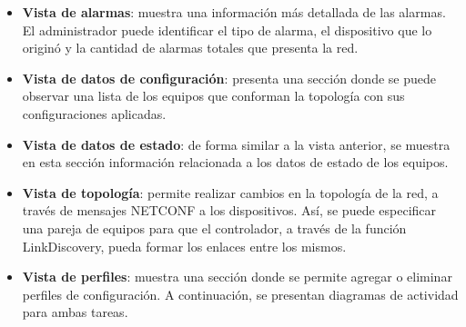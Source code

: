 \begin{itemize}
    \item \textbf{Vista de alarmas}: muestra una información más detallada de las alarmas. El administrador puede identificar el tipo de alarma, el dispositivo que lo originó y la cantidad de alarmas totales que presenta la red.
    
    \item \textbf{Vista de datos de configuración}: presenta una sección donde se puede observar una lista de los equipos que conforman la topología con sus configuraciones aplicadas.

    \item \textbf{Vista de datos de estado}: de forma similar a la vista anterior, se muestra en esta sección información relacionada a los datos de estado de los equipos. 

    \item \textbf{Vista de topología}: permite realizar cambios en la topología de la red, a través de mensajes NETCONF a los dispositivos. Así, se puede especificar una pareja de equipos para que el controlador, a través de la función LinkDiscovery, pueda formar los enlaces entre los mismos.
    
    \item \textbf{Vista de perfiles}: muestra una sección donde se permite agregar o eliminar perfiles de configuración. A continuación, se presentan diagramas de actividad para ambas tareas.  

    
    
\end{itemize}



